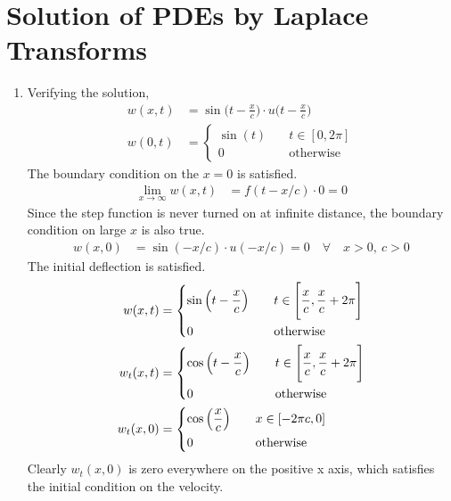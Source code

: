 \section{Solution of PDEs by Laplace Transforms}

\begin{enumerate}
    \item Verifying the solution,
          \begin{align}
              w(x, t) & = \sin\Big(t - \frac{x}{c}\Big) \cdot u\Big(t
              - \frac{x}{c}\Big)                                      \\
              w(0, t) & = \begin{cases}
                              \sin(t) & \quad t \in [0, 2\pi]  \\
                              0       & \quad \text{otherwise}
                          \end{cases}
          \end{align}
          The boundary condition on the $ x = 0 $ is satisfied.
          \begin{align}
              \lim_{x \to \infty} w(x, t) & = f(t - x/c) \cdot 0 = 0
          \end{align}
          Since the step function is never turned on at infinite distance, the
          boundary condition on large $ x $ is also true.
          \begin{align}
              w(x, 0) & = \sin(-x/c) \cdot u(-x/c) = 0 \quad \forall \quad x>0,\ c>0
          \end{align}
          The initial deflection is satisfied.
          \begin{align}
              w(x, t)   & =
              \begin{dcases}
                  \sin \Big( t - \frac{x}{c} \Big) & \quad t \in \Bigg[ \frac{x}{c},
                  \frac{x}{c} + 2\pi \Bigg]                                          \\
                  0                                & \quad \text{otherwise}
              \end{dcases}  \\
              w_t(x, t) & =
              \begin{dcases}
                  \cos \Big( t - \frac{x}{c} \Big) & \quad t \in \Bigg[ \frac{x}{c},
                  \frac{x}{c} + 2\pi \Bigg]                                          \\
                  0                                & \quad \text{otherwise}
              \end{dcases} \\
              w_t(x, 0) & =
              \begin{dcases}
                  \cos \Big(\frac{x}{c} \Big) & \quad x \in [-2\pi c, 0] \\
                  0                           & \quad \text{otherwise}
              \end{dcases}
          \end{align}
          Clearly $ w_t(x, 0) $ is zero everywhere on the positive x axis, which
          satisfies the initial condition on the velocity.


\end{enumerate}
